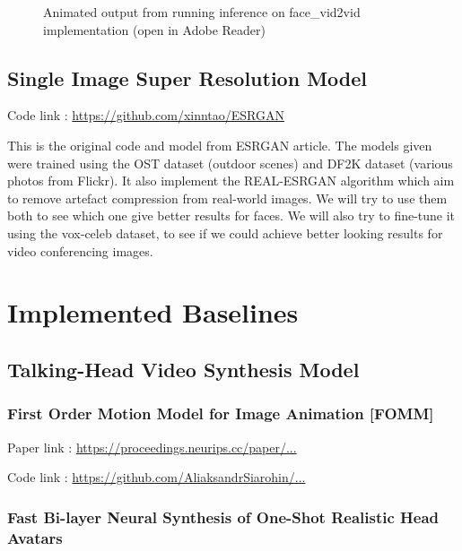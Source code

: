 \documentclass[twocolumn,10pt]{asme2ej}
\begin{document}
\begin{figure}[H] 
\centerline{}
\caption{Animated output from running inference on face\_vid2vid implementation (open in Adobe Reader)}
\label{AnimationInf}
\end{figure}

\subsection{Single Image Super Resolution Model}

Code link : \href{https://github.com/xinntao/ESRGAN}{https://github.com/xinntao/ESRGAN}

This is the original code and model from ESRGAN article. The models given were trained using the OST dataset (outdoor scenes) and DF2K dataset (various photos from Flickr). It also implement the REAL-ESRGAN algorithm which aim to remove artefact compression from real-world images. We will try to use them both to see which one give better results for faces. We will also try to fine-tune it using the vox-celeb dataset, to see if we could achieve better looking results for video conferencing images.

\section{Implemented Baselines}

\subsection{Talking-Head Video Synthesis Model}

\subsubsection{First Order Motion Model for Image Animation [FOMM]}

Paper link : \href{https://proceedings.neurips.cc/paper/2019/file/31c0b36aef265d9221af80872ceb62f9-Paper.pdf}{https://proceedings.neurips.cc/paper/...}

Code link : \href{https://github.com/AliaksandrSiarohin/first-order-model}{https://github.com/AliaksandrSiarohin/...}

\subsubsection{Fast Bi-layer Neural Synthesis of One-Shot
Realistic Head Avatars}
\end{document}
